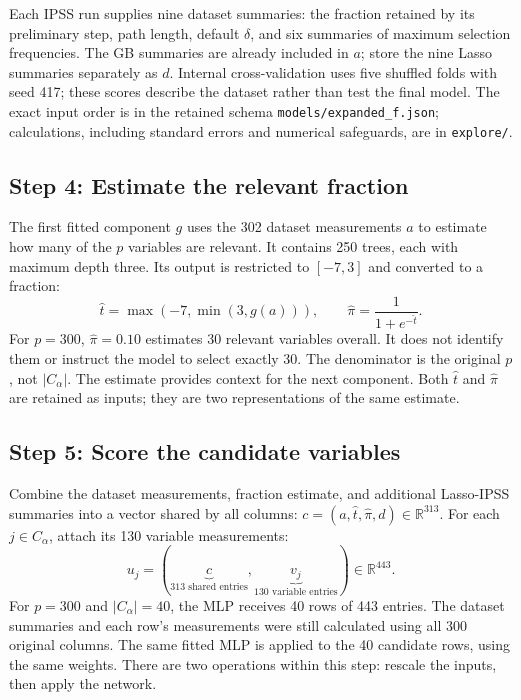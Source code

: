 \documentclass[10pt,letterpaper]{article}
\newcommand{\R}{\mathbb{R}}
\newcommand{\code}[1]{\nolinkurl{#1}}
\begin{document}
Each IPSS run supplies nine dataset summaries: the fraction retained
by its preliminary step, path length, default $\delta$, and six
summaries of maximum selection frequencies. The GB summaries are
already included in $a$; store the nine Lasso summaries separately
as $d$. Internal cross-validation uses
five shuffled folds with seed 417; these scores describe the dataset
rather than test the final model. The exact input order is in the retained schema
\code{models/expanded_f.json}; calculations, including standard errors
and numerical safeguards, are in \code{explore/}.

\subsection{Step 4: Estimate the relevant fraction}\label{sec:fraction}
The first fitted component $g$ uses the 302 dataset measurements
$a$ to estimate how many of the $p$ variables are relevant. It
contains 250 trees, each with maximum depth three. Its output is
restricted to $[-7,3]$ and converted to a fraction:
\[
 \widehat t=\max(-7,\min(3,g(a))),\qquad
 \widehat\pi=\frac{1}{1+e^{-\widehat t}}.
\]
For $p=300$, $\widehat\pi=0.10$ estimates 30 relevant variables
overall. It does not identify them or instruct the model to select
exactly 30. The denominator is the original $p$, not $|C_\alpha|$.
The estimate provides context for the next component.
Both $\widehat t$ and $\widehat\pi$ are retained as inputs; they are
two representations of the same estimate.

\subsection{Step 5: Score the candidate variables}\label{sec:score}
Combine the dataset measurements, fraction estimate, and additional
Lasso-IPSS summaries into a vector shared by all columns:
$c=(a,\widehat t,\widehat\pi,d)\in\R^{313}$. For each $j\in C_\alpha$,
attach its 130 variable measurements:
\begin{equation}\label{eq:input}
 u_j=(\underbrace{c}_{313\text{ shared entries}},
       \underbrace{v_j}_{130\text{ variable entries}})\in\R^{443}.
\end{equation}
For $p=300$ and $|C_\alpha|=40$, the MLP receives 40 rows of 443 entries.
The dataset summaries and each row's measurements were still calculated
using all 300 original columns. The same fitted MLP is applied to the
40 candidate rows, using the same weights.
There are two operations within this step: rescale the inputs, then apply
the network.
\end{document}
